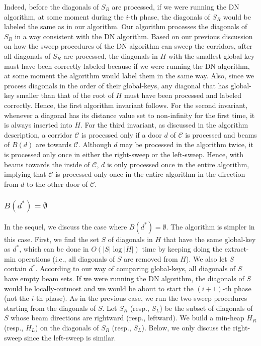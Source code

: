 \documentclass[english,runningheads,11pt]{llncs-revised}
\def\calC{\mathcal{C}}
\begin{document}
Indeed, before the diagonals of $S_R$ are processed, if we were running
the DN algorithm, at some moment during the $i$-th phase, the
diagonals of $S_R$ would be labeled the same as in our algorithm. Our algorithm
processes the diagonals of $S_R$ in a way consistent with the DN
algorithm. Based on our previous discussion on how the sweep procedures of the DN
algorithm can sweep the corridors, after all diagonals of $S_R$ are
processed, the diagonals in $H$ with the smallest global-key must have been
correctly labeled because if we were running the DN algorithm, at some
moment the algorithm would label them in the same way. Also, since we
process diagonals in the order of their global-keys, any
diagonal that has global-key smaller than that of the root of $H$ must have
been processed and labeled correctly. Hence, the first algorithm
invariant follows. For the second invariant, whenever a diagonal has
its distance value set to non-infinity for the first time, it is
always inserted into $H$.
For the third invariant, as discussed in
the algorithm description, a corridor $\calC$ is processed only if a
door $d$ of $\calC$ is processed and beams of $B(d)$ are towards
$\calC$. Although $d$ may be processed in the algorithm twice, it is
processed only once in either the right-sweep or the left-sweep.
Hence, with beams towards the inside of $\calC$, $d$ is only
processed once in the entire algorithm, implying that $\calC$ is
processed only once in the entire algorithm in the direction from $d$ to
the other door of $\calC$.


\subsubsection{$B(d^*)=\emptyset$}

In the sequel, we discuss the case where $B(d^*)=\emptyset$.
The algorithm is simpler in this case.  First,
we find the set $S$ of diagonals in $H$ that have the same global-key as $d^*$, which can be done in $O(|S|\log |H|)$ time by keeping doing the extract-min operations (i.e., all diagonals of $S$ are removed from $H$). We also let $S$ contain $d^*$. According to our way of comparing global-keys, all
diagonals of $S$ have empty beam sets. If we were running the DN
algorithm, the diagonals of $S$ would be locally-outmost
and we would be about to start the $(i+1)$-th phase (not the $i$-th phase).
As in the previous case, we run the two sweep procedures
starting from the diagonals of $S$.
Let $S_R$ (resp., $S_L$) be the subset of diagonals of $S$ whose beam directions
are rightward (resp., leftward).  We build a min-heap $H_R$ (resp., $H_L$)
on the diagonals of $S_R$ (resp., $S_L$).
Below, we only discuss the right-sweep since the left-sweep is similar.
\end{document}
